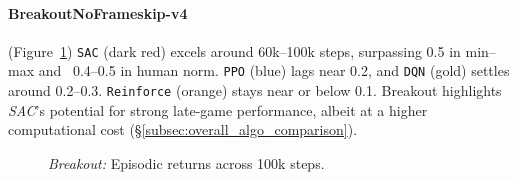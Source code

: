 \paragraph{BreakoutNoFrameskip-v4}
(Figure~\ref{fig:breakout_comparison_combined})
\texttt{SAC} (dark red) excels around 60k--100k steps, surpassing 0.5 in min--max 
and ~0.4--0.5 in human norm. \texttt{PPO} (blue) lags near 0.2, and \texttt{DQN} (gold) 
settles around 0.2--0.3. 
\texttt{Reinforce} (orange) stays near or below 0.1. 
Breakout highlights \emph{SAC}'s potential for strong late-game performance, 
albeit at a higher computational cost (\S\ref{subsec:overall_algo_comparison}).
\begin{figure} 
	\centering
	\quad
	\caption{\emph{Breakout:} Episodic returns across 100k steps.}
	\label{fig:breakout_comparison_combined}
\end{figure}

